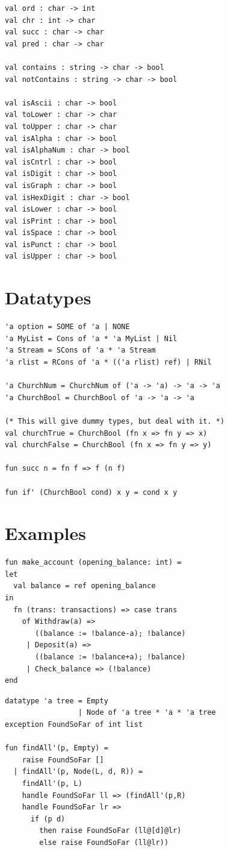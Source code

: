 \documentclass[10pt]{article}
\begin{document}
\begin{multicols}{2}
\begin{verbatim}
val ord : char -> int
val chr : int -> char
val succ : char -> char
val pred : char -> char

val contains : string -> char -> bool
val notContains : string -> char -> bool

val isAscii : char -> bool
val toLower : char -> char
val toUpper : char -> char
val isAlpha : char -> bool
val isAlphaNum : char -> bool
val isCntrl : char -> bool
val isDigit : char -> bool
val isGraph : char -> bool
val isHexDigit : char -> bool
val isLower : char -> bool
val isPrint : char -> bool
val isSpace : char -> bool
val isPunct : char -> bool
val isUpper : char -> bool
\end{verbatim}

\section{Datatypes}
\begin{verbatim}
'a option = SOME of 'a | NONE
'a MyList = Cons of 'a * 'a MyList | Nil
'a Stream = SCons of 'a * 'a Stream
'a rlist = RCons of 'a * (('a rlist) ref) | RNil

'a ChurchNum = ChurchNum of ('a -> 'a) -> 'a -> 'a
'a ChurchBool = ChurchBool of 'a -> 'a -> 'a

(* This will give dummy types, but deal with it. *)
val churchTrue = ChurchBool (fn x => fn y => x)
val churchFalse = ChurchBool (fn x => fn y => y)

fun succ n = fn f => f (n f)

fun if' (ChurchBool cond) x y = cond x y
\end{verbatim}

\section{Examples}
\begin{verbatim}
fun make_account (opening_balance: int) =
let
  val balance = ref opening_balance
in
  fn (trans: transactions) => case trans
    of Withdraw(a) =>
       ((balance := !balance-a); !balance)
     | Deposit(a) =>
       ((balance := !balance+a); !balance)
     | Check_balance => (!balance)
end
\end{verbatim}

\begin{verbatim}
datatype 'a tree = Empty
                 | Node of 'a tree * 'a * 'a tree
exception FoundSoFar of int list

fun findAll'(p, Empty) =
    raise FoundSoFar []
  | findAll'(p, Node(L, d, R)) =
    findAll'(p, L)
    handle FoundSoFar ll => (findAll'(p,R)
    handle FoundSoFar lr =>
      if (p d)
        then raise FoundSoFar (ll@[d]@lr)
        else raise FoundSoFar (ll@lr))


\end{verbatim}
\end{multicols}
\end{document}
